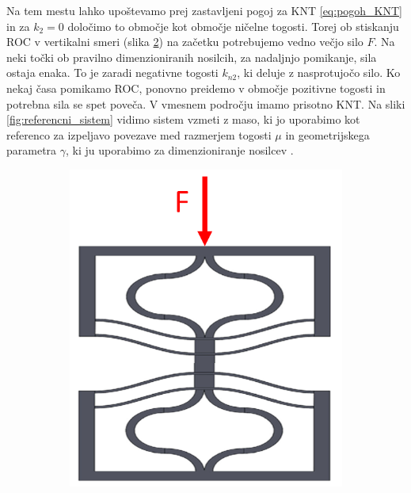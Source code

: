         Na tem mestu lahko upoštevamo prej zastavljeni pogoj za KNT \eqref{eq:pogoh_KNT} in za $k_2=0$ določimo to območje kot območje ničelne togosti. Torej ob stiskanju ROC v vertikalni smeri (slika \ref{fig:shema_roc}) na začetku potrebujemo vedno večjo silo $F$. Na neki točki ob pravilno dimenzioniranih nosilcih, za nadaljnjo pomikanje, sila ostaja enaka. To je zaradi negativne togosti $k_{n2}$, ki deluje z nasprotujočo silo. Ko nekaj časa pomikamo ROC, ponovno preidemo v območje pozitivne togosti in potrebna sila se spet poveča. V vmesnem področju imamo prisotno KNT. Na sliki \ref{fig:referencni_sistem} vidimo sistem vzmeti z maso, ki jo uporabimo kot referenco za izpeljavo povezave med razmerjem togosti $\mu$ in geometrijskega parametra $\gamma$, ki ju uporabimo za dimenzioniranje nosilcev \cite{dalela2022design}. 
        \begin{figure}[!htb]
                \centering
                \begin{subfigure}{.341\textwidth}
                    \centering
                    \includegraphics[width=\linewidth]{Magisterski praktikum/slike/teorija/shema_ROC.png}
                    \caption{}
                    \label{fig:shema_roc}

\end{subfigure}
\end{figure}

